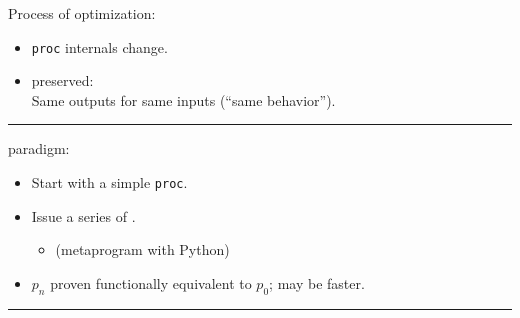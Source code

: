 \newpage
{}

{\large

}

\newpage
{}

{\large

}

\newpage
{}

\begin{center}
{\large
\begin{tikzpicture}[node distance=8mm]

\end{tikzpicture}
}
\end{center}

{\LARGE
Process of optimization:
\begin{itemize}
  \item \texttt{proc} internals change.
  \item {} preserved:\\ Same outputs for same inputs (``same behavior'').
\end{itemize}

}
\vfill
\hrule
{\large

}


\newpage
{}

\begin{center}
{\large
\begin{tikzpicture}[node distance=8mm]

\end{tikzpicture}
}
\end{center}

{\LARGE
{} paradigm:
\begin{itemize}
  \item Start with a simple \texttt{proc}.
  \item Issue a series of .
  \begin{itemize}
    \item (metaprogram with Python)
  \end{itemize}
  \item $p_n$ proven functionally equivalent to $p_0$; may be faster.
\end{itemize}

}
\vfill
\hrule
{\large

}


\newpage
{}

